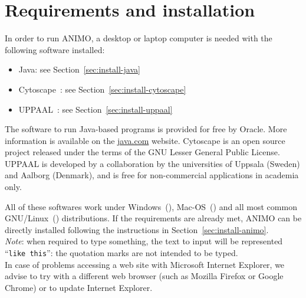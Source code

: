 \makeatother




\thispagestyle{empty}
\tableofcontents
\clearpage

\setcounter{page}{1}
\setcounter{section}{0}

\renewcommand\figurename{Figure}
\renewcommand*\thefigure{S\arabic{figure}}
\renewcommand*\thetable{S\arabic{table}}

\def\ta{TA}
\def\tas{TA}




\section{Requirements and installation}\label{sec:animo-installation}
In order to run ANIMO, a desktop or laptop computer is needed with the following software installed:
\begin{itemize}
  \item Java: see Section~\ref{sec:install-java}
  \item Cytoscape~\citep{cytoscape}: see Section~\ref{sec:install-cytoscape}
  \item UPPAAL~\citep{uppaal}: see Section~\ref{sec:install-uppaal}
\end{itemize}
The software to run Java-based programs is provided for free by Oracle. More information
is available on the \url{java.com} website.
Cytoscape is an open source project released under the terms of the GNU Lesser General Public License.
UPPAAL is developed by a collaboration by the universities of Uppsala (Sweden) and Aalborg (Denmark),
and is free for non-commercial applications in academia only.

All of these softwares work under Windows~(\winsymbol), Mac-OS~(\macsymbol) and all most common GNU/Linux~(\linuxsymbol) distributions.
If the requirements are already met, ANIMO can be directly installed following the instructions in Section~\ref{sec:install-animo}.\\
\emph{Note}: when required to type something, the text to input will be represented ``{\tt like this}'': the quotation marks
are not intended to be typed.\\
In case of problems accessing a web site with Microsoft Internet Explorer, we advise to try with a different web browser (such as Mozilla Firefox or
Google Chrome) or to update Internet Explorer.

